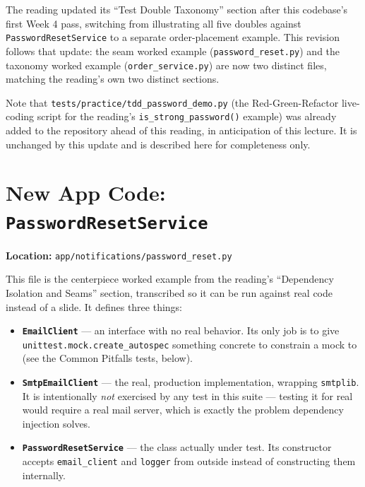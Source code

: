 \documentclass[11pt]{article}
\begin{document}
\begin{keyidea}
The reading updated its ``Test Double Taxonomy'' section after this
codebase's first Week 4 pass, switching from illustrating all five
doubles against \texttt{PasswordResetService} to a separate
order-placement example. This revision follows that update: the seam
worked example (\texttt{password\_reset.py}) and the taxonomy worked
example (\texttt{order\_service.py}) are now two distinct files, matching
the reading's own two distinct sections.
\end{keyidea}

Note that \texttt{tests/practice/tdd\_password\_demo.py} (the
Red-Green-Refactor live-coding script for the reading's
\texttt{is\_strong\_password()} example) was already added to the
repository ahead of this reading, in anticipation of this lecture. It is
unchanged by this update and is described here for completeness only.

\section{New App Code: \texttt{PasswordResetService}}
\textbf{Location:} \texttt{app/notifications/password\_reset.py}

This file is the centerpiece worked example from the reading's
``Dependency Isolation and Seams'' section, transcribed so it can be run
against real code instead of a slide. It defines three things:

\begin{itemize}
\item \textbf{\texttt{EmailClient}} --- an interface with no real
behavior. Its only job is to give \texttt{unittest.mock.create\_autospec}
something concrete to constrain a mock to (see the Common Pitfalls
tests, below).
\item \textbf{\texttt{SmtpEmailClient}} --- the real, production
implementation, wrapping \texttt{smtplib}. It is intentionally
\emph{not} exercised by any test in this suite --- testing it for real
would require a real mail server, which is exactly the problem
dependency injection solves.
\item \textbf{\texttt{PasswordResetService}} --- the class actually
under test. Its constructor accepts \texttt{email\_client} and
\texttt{logger} from outside instead of constructing them internally.
\end{itemize}
\end{document}
